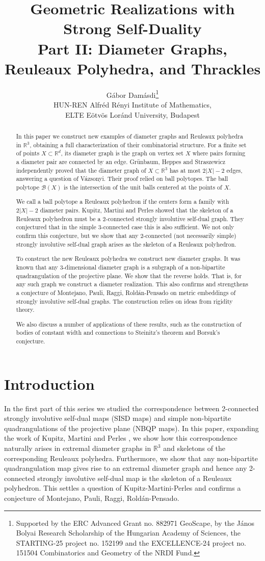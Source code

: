 \documentclass{article}
\title{Geometric Realizations with Strong Self-Duality \\[0.5em]
\large Part II: Diameter Graphs, Reuleaux Polyhedra, and Thrackles}
\author{Gábor Damásdi\footnote{Supported by the ERC Advanced Grant no. 882971 GeoScape, by the János Bolyai Research Scholarship of the Hungarian Academy of Sciences, the STARTING-25 project no. 152199 and the EXCELLENCE-24 project no. 151504 Combinatorics and Geometry of the NRDI Fund.} \\ \small HUN-REN Alfr\'ed R\'enyi Institute of Mathematics,\\ \small ELTE Eötvös Loránd University, Budapest }
\newcounter{example}
\newcommand{\R}[0]{\mathbb{R}}
\begin{document}
\maketitle
\begin{abstract}
 In this paper we construct new examples of diameter graphs and Reuleaux polyhedra in $\mathbb{R}^3$, obtaining a full characterization of their combinatorial structure. For a finite set of points $X\subset\mathbb{R}^d$, its diameter graph is the graph on vertex set $X$ where pairs forming a diameter pair are connected by an edge. Grünbaum, Heppes and Straszewicz independently proved that the diameter graph of $X\subset \R^3$ has at most $2|X|-2$ edges, answering a question of Vázsonyi. Their proof relied on ball polytopes. The ball polytope $\mathcal{B}(X)$ is the intersection of the unit balls centered at the points of $X$. 
 
 We call a ball polytope a Reuleaux polyhedron if the centers form a family with $2|X|-2$ diameter pairs. Kupitz, Martini and Perles showed that the skeleton of a Reuleaux polyhedron must be a 2-connected strongly involutive self-dual graph. They conjectured that in the simple 3-connected case this is also sufficient. We not only confirm this conjecture, but we show that any 2-connected (not necessarily simple) strongly involutive self-dual graph arises as the skeleton of a Reuleaux polyhedron. 
 
To construct the new Reuleaux polyhedra we construct new diameter graphs.  It was known that any 3-dimensional diameter graph is a subgraph of a non-bipartite quadrangulation of the projective plane. We show that the reverse holds. That is, for any such graph we construct a diameter realization.  This also confirms and strengthens a conjecture of Montejano, Pauli, Raggi, Roldán-Pensado on metric embeddings of strongly involutive self-dual graphs. The construction relies on ideas from rigidity theory.

We also discuss a  number of applications of these results, such as the construction of bodies of constant width and connections to Steinitz’s theorem and Borsuk's conjecture.
 \end{abstract}

\section{Introduction}




In the first part of this series we studied the correspondence between 2-connected strongly involutive self-dual maps (SISD maps) and  simple non-bipartite quadrangulations of the projective plane (NBQP maps). In this paper, expanding the work of Kupitz, Martini and Perles \cite{kupitz2010ball}, we  show how this correspondence naturally arises in extremal diameter graphs in $\R^3$ and skeletons of the corresponding Reuleaux polyhedra. Furthermore, we show that any non-bipartite quadrangulation map gives rise to an extremal diameter graph and hence any 2-connected strongly involutive self-dual map is the skeleton of a Reuleaux polyhedron. This settles a question of Kupitz-Martini-Perles and confirms a conjecture of Montejano, Pauli, Raggi, Roldán-Pensado.  
\end{document}
